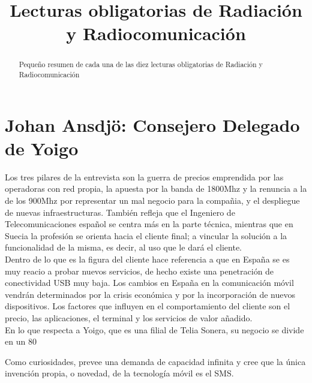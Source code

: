 \documentclass[twocolumn]{article}
\title{Lecturas obligatorias de Radiación y Radiocomunicación}
\author{}
\date{}
\begin{document}
\maketitle

\begin{abstract}

Pequeño resumen de cada una de las diez lecturas obligatorias de Radiación y Radiocomunicación

\end{abstract}



\section{Johan Ansdjö: Consejero Delegado de Yoigo}
Los tres pilares de la entrevista son la guerra de precios emprendida por las operadoras con red propia, la apuesta por la banda de 1800Mhz y la renuncia a la de los 900Mhz por representar un mal negocio para la compañia, y el despliegue de nuevas infraestructuras. También refleja que el Ingeniero de Telecomunicaciones español se centra más en la parte técnica, mientras que en Suecia la profesión se orienta hacia el cliente final; a vincular la solución a la funcionalidad de la misma, es decir, al uso que le dará el cliente.\\

Dentro de lo que es la figura del cliente hace referencia a que en España se es muy reacio a probar nuevos servicios, de hecho existe una penetración de conectividad USB muy baja. Los cambios en España en la comunicación móvil vendrán determinados por la crisis económica y por la incorporación de nuevos dispositivos. Los factores que influyen en el comportamiento del cliente son el precio, las aplicaciones, el terminal y los servicios de valor añadido.\\

En lo que respecta a Yoigo, que es una filial de Telia Sonera, su negocio se divide en un 80%

Como curiosidades, prevee una demanda de capacidad infinita y cree que la única invención propia, o novedad, de la tecnología móvil es el SMS.

\section{}
\end{document}
